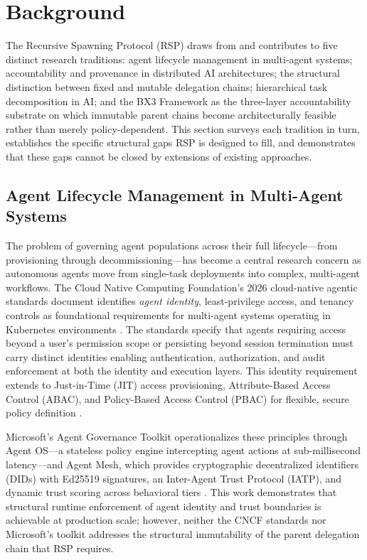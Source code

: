 \section{Background}
\label{sec:background}

The Recursive Spawning Protocol (RSP) draws from and contributes to five distinct research traditions: agent lifecycle management in multi-agent systems; accountability and provenance in distributed AI architectures; the structural distinction between fixed and mutable delegation chains; hierarchical task decomposition in AI; and the BX3 Framework as the three-layer accountability substrate on which immutable parent chains become architecturally feasible rather than merely policy-dependent. This section surveys each tradition in turn, establishes the specific structural gaps RSP is designed to fill, and demonstrates that these gaps cannot be closed by extensions of existing approaches.

\subsection{Agent Lifecycle Management in Multi-Agent Systems}

The problem of governing agent populations across their full lifecycle---from provisioning through decommissioning---has become a central research concern as autonomous agents move from single-task deployments into complex, multi-agent workflows. The Cloud Native Computing Foundation's 2026 cloud-native agentic standards document identifies \emph{agent identity}, least-privilege access, and tenancy controls as foundational requirements for multi-agent systems operating in Kubernetes environments \cite{cncf-agentic-standards}. The standards specify that agents requiring access beyond a user's permission scope or persisting beyond session termination must carry distinct identities enabling authentication, authorization, and audit enforcement at both the identity and execution layers. This identity requirement extends to Just-in-Time (JIT) access provisioning, Attribute-Based Access Control (ABAC), and Policy-Based Access Control (PBAC) for flexible, secure policy definition \cite{cncf-agentic-standards}.

Microsoft's Agent Governance Toolkit operationalizes these principles through Agent OS---a stateless policy engine intercepting agent actions at sub-millisecond latency---and Agent Mesh, which provides cryptographic decentralized identifiers (DIDs) with Ed25519 signatures, an Inter-Agent Trust Protocol (IATP), and dynamic trust scoring across behavioral tiers \cite{microsoft-agent-governance}. This work demonstrates that structural runtime enforcement of agent identity and trust boundaries is achievable at production scale; however, neither the CNCF standards nor Microsoft's toolkit addresses the structural immutability of the parent delegation chain that RSP requires.

